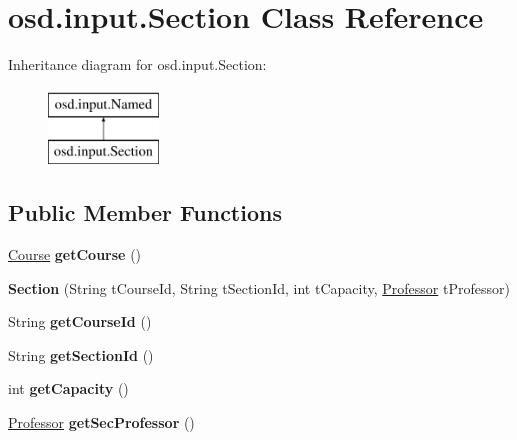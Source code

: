 \hypertarget{interfaceosd_1_1input_1_1_section}{\section{osd.\-input.\-Section Class Reference}
\label{interfaceosd_1_1input_1_1_section}
}
Inheritance diagram for osd.\-input.\-Section\-:\begin{figure}[H]
\begin{center}
\leavevmode
\includegraphics[height=2.000000cm]{interfaceosd_1_1input_1_1_section}
\end{center}
\end{figure}
\subsection*{Public Member Functions}
\begin{DoxyCompactItemize}
\item 
\hypertarget{interfaceosd_1_1input_1_1_section_a2df3a415bc510373a07d41ecd82e2e8e}{\hyperlink{interfaceosd_1_1input_1_1_course}{Course} {\bfseries get\-Course} ()}\label{interfaceosd_1_1input_1_1_section_a2df3a415bc510373a07d41ecd82e2e8e}

\item 
\hypertarget{interfaceosd_1_1input_1_1_section_a6a2334ee4c53a32f34b780b6e451aaca}{{\bfseries Section} (String t\-Course\-Id, String t\-Section\-Id, int t\-Capacity, \hyperlink{interfaceosd_1_1input_1_1_professor}{Professor} t\-Professor)}\label{interfaceosd_1_1input_1_1_section_a6a2334ee4c53a32f34b780b6e451aaca}

\item 
\hypertarget{interfaceosd_1_1input_1_1_section_af46be083d097979980bfd0b0f5107ad7}{String {\bfseries get\-Course\-Id} ()}\label{interfaceosd_1_1input_1_1_section_af46be083d097979980bfd0b0f5107ad7}

\item 
\hypertarget{interfaceosd_1_1input_1_1_section_a46b8bae68a9a19f6142aaf7b352cb9de}{String {\bfseries get\-Section\-Id} ()}\label{interfaceosd_1_1input_1_1_section_a46b8bae68a9a19f6142aaf7b352cb9de}

\item 
\hypertarget{interfaceosd_1_1input_1_1_section_ab9112a652964601ad4ca890a5f982b03}{int {\bfseries get\-Capacity} ()}\label{interfaceosd_1_1input_1_1_section_ab9112a652964601ad4ca890a5f982b03}

\item 
\hypertarget{interfaceosd_1_1input_1_1_section_a1d130811d59d44083852e3036d3e40dd}{\hyperlink{interfaceosd_1_1input_1_1_professor}{Professor} {\bfseries get\-Sec\-Professor} ()}\label{interfaceosd_1_1input_1_1_section_a1d130811d59d44083852e3036d3e40dd}

\end{DoxyCompactItemize}
